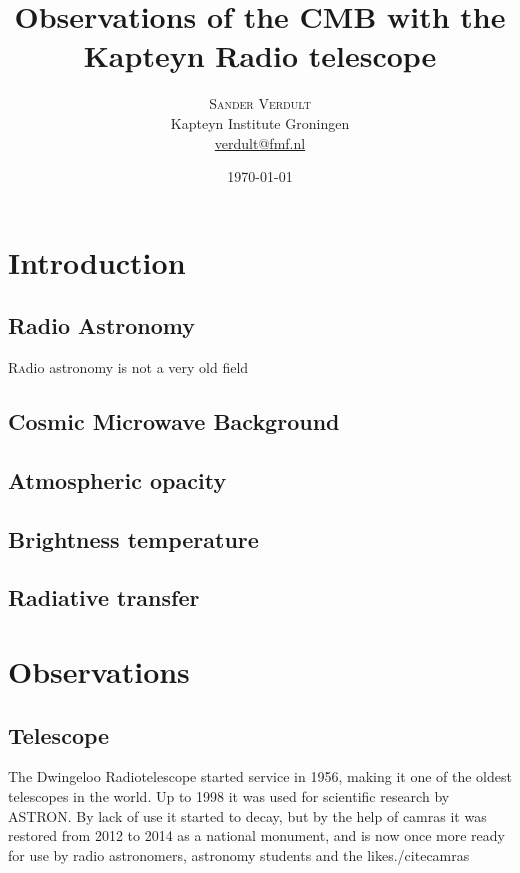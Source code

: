 \documentclass[twoside,twocolumn]{article}
\title{Observations of the CMB with the Kapteyn Radio telescope} %
\author{%
	\textsc{Sander Verdult}\\%
	\normalsize Kapteyn Institute Groningen \\ %
	\normalsize \href{verdult@fmf.nl}{verdult@fmf.nl} %
}
\date{\today} %
\begin{document}
	
	\maketitle
	
	
	\section{Introduction}
	\subsection{Radio Astronomy}
	\lettrine[nindent=0em,lines=2]{R}adio astronomy is not a very old field
	
	\subsection{Cosmic Microwave Background}

	\subsection{Atmospheric opacity}

	\subsection{Brightness temperature}
	
	\subsection{Radiative transfer}
	
	
	\section{Observations}
	
	\subsection{Telescope}
		The Dwingeloo Radiotelescope started service in 1956, making it one of the oldest telescopes in the world. Up to 1998 it was used for scientific research by ASTRON. By lack of use it started to decay, but by the help of camras it was restored from 2012 to 2014 as a national monument, and is now once more ready for use by radio astronomers, astronomy students and the likes./cite{camras}
		
\end{document}
